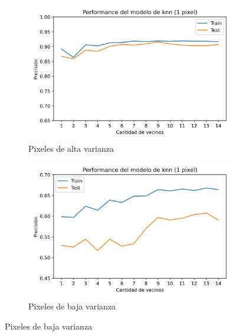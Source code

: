 \documentclass[10pt,a4paper]{article}
\begin{document}
\begin{figure}[ht!]
	\begin{subfigure}{0.5\textwidth}
		\includegraphics[width=0.9\linewidth]{imagenes/1pixelalto.png} 
		\caption{Pixeles de alta varianza}
		\label{fig:subfig1}
	\end{subfigure}
	\begin{subfigure}{0.5\textwidth}
		\includegraphics[width=0.9\linewidth]{Imagenes/1pixelbajo.png}
		\caption{Pixeles de baja varianza}
		\label{fig:subfig2}
	\end{subfigure}
	\label{fig:subfigs}
\end{figure}
\end{document}
